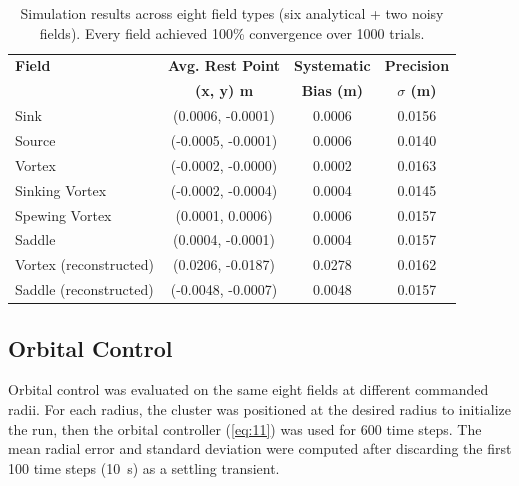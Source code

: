 \documentclass[lettersize,journal]{IEEEtran}
\begin{document}
\begin{table}[!t]
\footnotesize
\centering
\caption{Simulation results across eight field types (six analytical + two noisy fields). Every field achieved 100\% convergence over 1000 trials.}
\label{tab:simulation_estimation_results}
\setlength{\tabcolsep}{4pt}
\begin{tabular}{lccc}
\hline
\textbf{Field} & \textbf{Avg. Rest Point} & \textbf{Systematic} & \textbf{Precision} \\
 & \textbf{(x, y) m} & \textbf{Bias (m)} & \textbf{$\sigma$ (m)} \\
\hline
Sink & (0.0006, -0.0001) & 0.0006 & 0.0156 \\
Source & (-0.0005, -0.0001) & 0.0006 & 0.0140 \\
Vortex & (-0.0002, -0.0000) & 0.0002 & 0.0163 \\
Sinking Vortex & (-0.0002, -0.0004) & 0.0004 & 0.0145 \\
Spewing Vortex & (0.0001, 0.0006) & 0.0006 & 0.0157 \\
Saddle & (0.0004, -0.0001) & 0.0004 & 0.0157 \\
Vortex (reconstructed) & (0.0206, -0.0187) & 0.0278 & 0.0162 \\
Saddle (reconstructed) & (-0.0048, -0.0007) & 0.0048 & 0.0157 \\
\hline
\end{tabular}
\end{table}


\subsection{Orbital Control}

Orbital control was evaluated on the same eight fields at different commanded radii. For each radius, the cluster was positioned at the desired radius to initialize the run, then the orbital controller (\ref{eq:11}) was used for 600 time steps. The mean radial error and standard deviation were computed after discarding the first 100 time steps (10~s) as a settling transient.
\end{document}
